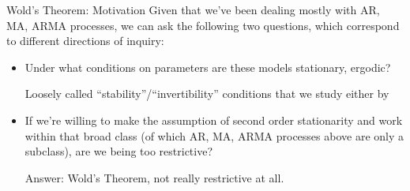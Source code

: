 \documentclass[aspectratio=169, handout]{beamer}
\begin{document}
{\footnotesize
\begin{frame}{Wold's Theorem: Motivation}
Given that we've been dealing mostly with AR, MA, ARMA processes,
we can ask the following two questions, which correspond to different
directions of inquiry:
\begin{itemize}
  \item
    Under what \alert{conditions on parameters} are these models
    stationary, ergodic?
    \pause

    Loosely called ``stability''/``invertibility''
    conditions that we study either by

  \pause
  \item
    If we're willing to make the assumption of second order stationarity
    and work within that broad class
    (of which AR, MA, ARMA processes above are only a \alert{subclass}),
    are we being too restrictive?

    \pause
    Answer: Wold's Theorem, not really restrictive at all.
\end{itemize}
\end{frame}
}




\end{document}

